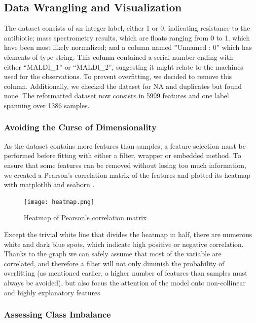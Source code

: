 \documentclass{article}
\begin{document}
\subsection{Data Wrangling and Visualization}

The dataset consists of an integer label, either 1 or 0, indicating resistance to the antibiotic; mass
spectrometry results, which are floats ranging from 0 to 1, which have been most likely normalized; and a
column named ”Unnamed : 0” which has elements of type string. This column contained a serial number
ending with either “MALDI\_1” or “MALDI\_2”, suggesting it might relate to the machines used for the
observations. To prevent overfitting, we decided to remove this column. Additionally, we checked the
dataset for NA and duplicates but found none. The reformatted dataset now consists in 5999 features
and one label spanning over 1386 samples. 

\subsubsection{Avoiding the Curse of Dimensionality}

As the dataset contains more features than samples, a feature
selection must be performed before fitting with either a filter, wrapper or embedded method. To ensure
that some features can be removed without losing too much information, we created a Pearson’s correlation
matrix of the features and plotted its heatmap with matplotlib \citep{matplotlib} and seaborn \citep{seaborn}.\\

\newpage

\begin{figure}
	\centering
	\texttt{[image: heatmap.png]}
	 \vspace{-3em}
	\caption{Heatmap of Pearson's correlation matrix}
\end{figure}

Except the trivial white line that divides the heatmap in half, there are numerous white and dark blue spots, which indicate high positive or negative correlation. Thanks to the graph we can safely assume that most of the variable are correlated, and therefore a filter will not only diminish the probability of overfitting (as mentioned earlier, a higher number of features than samples must always be avoided), but also focus the attention of the model onto non-collinear and highly explanatory features. 

\subsubsection{Assessing Class Imbalance}
\end{document}
